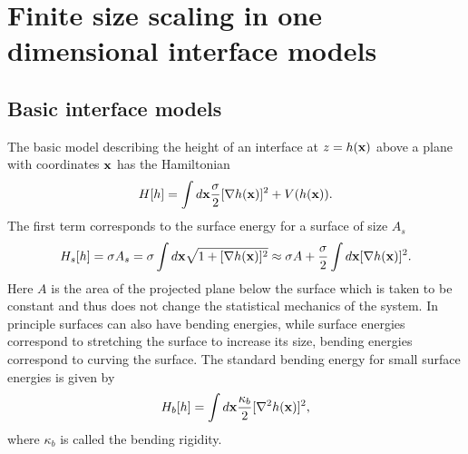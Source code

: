 \section{Finite size scaling in one dimensional interface models}
\subsection{Basic interface models}
The basic model describing the height of an interface at $z=h({\bf x})$ above a plane with coordinates ${\bf x}$ has the Hamiltonian 
\begin{equation}
H[h] = \int d{\bf x}\frac{\sigma}{2} [\nabla h({\bf x})]^2 + V(h({\bf x})).
\end{equation}
The first term corresponds to the surface energy for a surface of size $A_s$ 
\begin{equation}
H_s[h] = \sigma A_s =\sigma\int d{\bf x} \sqrt{1+[\nabla h({\bf x})]^2}\approx \sigma A + \frac{\sigma}{2}\int d{\bf x} [\nabla h({\bf x})]^2 .
\end{equation}
Here $A$ is the area of the projected plane below the surface which is taken to be constant and thus does not change the statistical mechanics of the system. In principle surfaces can also have bending energies, while surface energies correspond to stretching the surface to increase its size, bending energies correspond to curving the surface. The standard bending energy for small surface energies is given by
\begin{equation}
H_b[h] = \int d{\bf x} \frac{\kappa_b}{2}[\nabla^2 h({\bf x})]^2,
\end{equation} 
where $\kappa_b$ is called the bending rigidity.

